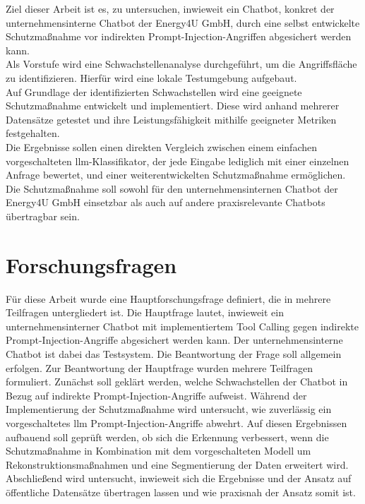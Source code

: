 Ziel dieser Arbeit ist es, zu untersuchen, inwieweit ein Chatbot, konkret der unternehmensinterne Chatbot der Energy4U GmbH, durch eine selbst entwickelte 
Schutzmaßnahme vor indirekten Prompt-Injection-Angriffen abgesichert werden kann. \\
Als Vorstufe wird eine Schwachstellenanalyse durchgeführt, um die Angriffsfläche 
zu identifizieren. Hierfür wird eine lokale Testumgebung aufgebaut. \\
Auf Grundlage der identifizierten Schwachstellen wird eine geeignete Schutzmaßnahme entwickelt und implementiert. Diese wird anhand mehrerer Datensätze getestet und 
ihre Leistungsfähigkeit mithilfe geeigneter Metriken festgehalten. \\
Die Ergebnisse sollen einen direkten Vergleich zwischen einem einfachen vorgeschalteten \ac{llm}-Klassifikator, der jede Eingabe lediglich mit einer einzelnen Anfrage 
bewertet, und einer weiterentwickelten Schutzmaßnahme ermöglichen. Die Schutzmaßnahme soll sowohl für den unternehmensinternen Chatbot der Energy4U GmbH einsetzbar als 
auch auf andere praxisrelevante Chatbots übertragbar sein.

\section{Forschungsfragen}

Für diese Arbeit wurde eine Hauptforschungsfrage definiert, die in mehrere Teilfragen untergliedert ist. Die Hauptfrage lautet, inwieweit ein unternehmensinterner 
Chatbot mit implementiertem Tool Calling gegen indirekte Prompt-Injection-Angriffe abgesichert werden kann. Der unternehmensinterne Chatbot ist dabei das Testsystem.
Die Beantwortung der Frage soll allgemein erfolgen. Zur Beantwortung der Hauptfrage wurden mehrere Teilfragen formuliert. Zunächst soll geklärt werden, welche 
Schwachstellen der Chatbot in Bezug auf indirekte Prompt-Injection-Angriffe aufweist. Während der Implementierung der Schutzmaßnahme wird untersucht, wie zuverlässig
ein vorgeschaltetes \ac{llm} Prompt-Injection-Angriffe abwehrt. Auf diesen Ergebnissen aufbauend soll geprüft werden, ob sich die Erkennung verbessert, wenn die 
Schutzmaßnahme in Kombination mit dem vorgeschalteten Modell um Rekonstruktionsmaßnahmen und eine Segmentierung der Daten erweitert wird. Abschließend wird untersucht,
inwieweit sich die Ergebnisse und der Ansatz auf öffentliche Datensätze übertragen lassen und wie praxisnah der Ansatz somit ist.


